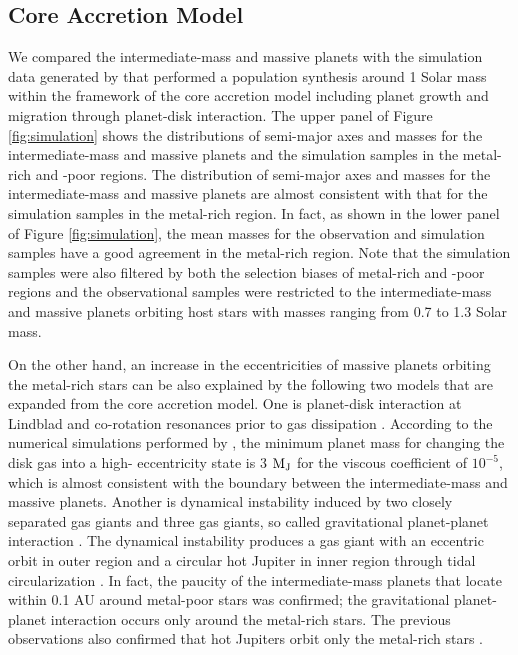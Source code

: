 \documentclass[twocolumn, dvipdfmx]{aastex62}
\begin{document}
\begin{CJK*}{UTF8}{min}
\subsection{Core Accretion Model} \label{subsec:accretion}

We compared the intermediate-mass and massive planets with the simulation data generated by \cite{2012A&A...541A..97M} that performed a population synthesis around 1 Solar mass within the framework of the core accretion model including planet growth and migration through planet-disk interaction. The upper panel of Figure \ref{fig:simulation} shows the distributions of semi-major axes and masses for the intermediate-mass and massive planets and the simulation samples in the metal-rich and -poor regions. The distribution of semi-major axes and masses for the intermediate-mass and massive planets are almost consistent with that for the simulation samples in the metal-rich region. In fact, as shown in the lower panel of Figure \ref{fig:simulation}, the mean masses for the observation and simulation samples have a good agreement in the metal-rich region. Note that the simulation samples were also filtered by both the selection biases of metal-rich and -poor regions and the observational samples were restricted to the intermediate-mass and massive planets orbiting host stars with masses ranging from 0.7 to 1.3 Solar mass.

On the other hand, an increase in the eccentricities of massive planets orbiting the metal-rich stars can be also explained by the following two models that are expanded from the core accretion model. One is planet-disk interaction at Lindblad and co-rotation resonances prior to gas dissipation \citep[e.g.,][]{2003ApJ...585.1024G}. According to the numerical simulations performed by \cite{2006A&A...447..369K}, the minimum planet mass for changing the disk gas into a high- eccentricity state is 3 $\rm M_J$ for the viscous coefficient of $10^{-5}$, which is almost consistent with the boundary between the intermediate-mass and massive planets. Another is dynamical instability induced by two closely separated gas giants and three gas giants, so called gravitational planet-planet interaction \citep[e.g.,][]{2013ApJ...775...42I}. The dynamical instability produces a gas giant with an eccentric orbit in outer region and a circular hot Jupiter in inner region through tidal circularization \citep[e.g.,][]{1996Sci...274..954R}. In fact, the paucity of the intermediate-mass planets that locate within 0.1 AU around metal-poor stars was confirmed; the gravitational planet-planet interaction occurs only around the metal-rich stars. The previous observations also confirmed that hot Jupiters orbit only the metal-rich stars \citep{2013ApJ...767L..24D, 2013A&A...560A..51A}.


\end{CJK*}
\end{document}
